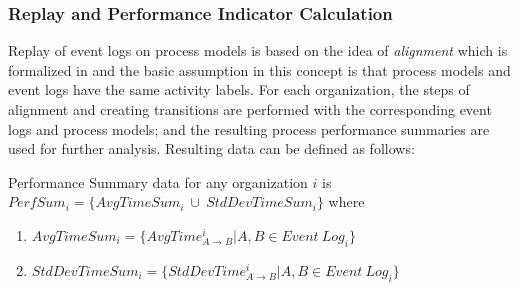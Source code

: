 \subsubsection{Replay and Performance Indicator Calculation}
\label{subsubsec:replay-and-performance-summary}
Replay of event logs on process models is based on the idea of \textit{alignment} which is formalized in \cite{van2012replaying} and the basic assumption in this concept is that process models and event logs have the same activity labels. For each organization, the steps of alignment and creating transitions are performed with the corresponding event logs and process models; and the resulting process performance summaries are used for further analysis. Resulting data can be defined as follows:
  \theoremstyle{definition}
  \begin{definition}{} Performance Summary data for any organization $i$ is $PerfSum_{i}= \{AvgTimeSum_{i}\ \cup\ StdDevTimeSum_{i}\}$ where
    \begin{enumerate}
      \item $AvgTimeSum_{i} = \{ AvgTime_{A \rightarrow B}^{i} | A , B  \in Event\ Log_{i}\}$
      \item $StdDevTimeSum_{i} = \{ StdDevTime_{ A\rightarrow B}^{i} | A, B  \in Event\ Log_{i}\}$
    \end{enumerate}
  \end{definition}

